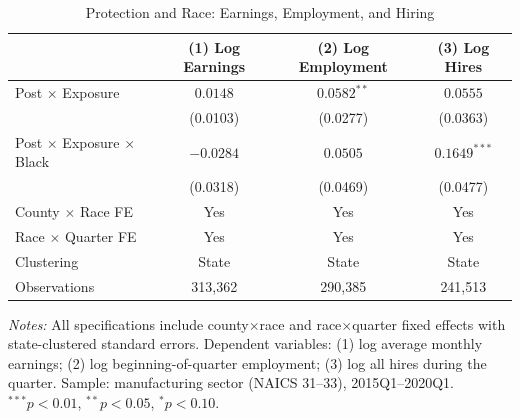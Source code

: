\begin{table}
\begin{threeparttable}[htbp]
\centering
\caption{Protection and Race: Earnings, Employment, and Hiring}
\label{tab:margins}
\begin{tabular}{lccc}
\toprule
 & (1) Log Earnings & (2) Log Employment & (3) Log Hires \\
\midrule
Post $\times$ Exposure & $0.0148$ & $0.0582^{**}$ & $0.0555$ \\
 & (0.0103) & (0.0277) & (0.0363) \\[6pt]
Post $\times$ Exposure $\times$ Black & $-0.0284$ & $0.0505$ & $0.1649^{***}$ \\
 & (0.0318) & (0.0469) & (0.0477) \\
\midrule
County $\times$ Race FE & Yes & Yes & Yes \\
Race $\times$ Quarter FE & Yes & Yes & Yes \\
Clustering & State & State & State \\
Observations & 313,362 & 290,385 & 241,513 \\
\bottomrule
\end{tabular}
\begin{tablenotes}
\small
\item \textit{Notes:} All specifications include county$\times$race and race$\times$quarter fixed effects with state-clustered standard errors. Dependent variables: (1) log average monthly earnings; (2) log beginning-of-quarter employment; (3) log all hires during the quarter. Sample: manufacturing sector (NAICS 31--33), 2015Q1--2020Q1. $^{***}p<0.01$, $^{**}p<0.05$, $^{*}p<0.10$.
\end{tablenotes}
\end{threeparttable}
\end{table}
